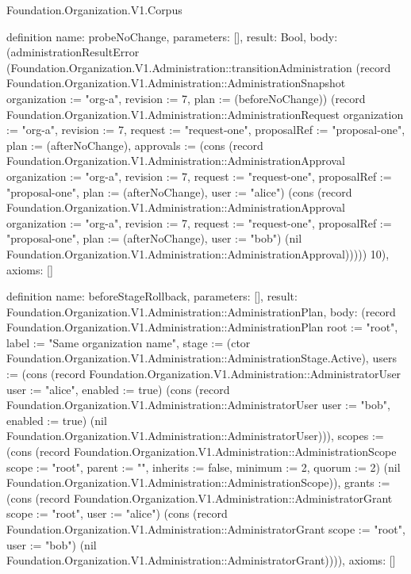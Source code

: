 \begin{lexlean}{Foundation.Organization.V1.Corpus}
\begin{semanticmodule}
definition{
  name: probeNoChange,
  parameters: [],
  result: Bool,
  body: (administrationResultError (Foundation.Organization.V1.Administration::transitionAdministration (record Foundation.Organization.V1.Administration::AdministrationSnapshot {organization := "org-a", revision := 7, plan := (beforeNoChange)}) (record Foundation.Organization.V1.Administration::AdministrationRequest {organization := "org-a", revision := 7, request := "request-one", proposalRef := "proposal-one", plan := (afterNoChange), approvals := (cons (record Foundation.Organization.V1.Administration::AdministrationApproval {organization := "org-a", revision := 7, request := "request-one", proposalRef := "proposal-one", plan := (afterNoChange), user := "alice"}) (cons (record Foundation.Organization.V1.Administration::AdministrationApproval {organization := "org-a", revision := 7, request := "request-one", proposalRef := "proposal-one", plan := (afterNoChange), user := "bob"}) (nil Foundation.Organization.V1.Administration::AdministrationApproval)))})) 10),
  axioms: []
}

definition{
  name: beforeStageRollback,
  parameters: [],
  result: Foundation.Organization.V1.Administration::AdministrationPlan,
  body: (record Foundation.Organization.V1.Administration::AdministrationPlan {root := "root", label := "Same organization name", stage := (ctor Foundation.Organization.V1.Administration::AdministrationStage.Active), users := (cons (record Foundation.Organization.V1.Administration::AdministratorUser {user := "alice", enabled := true}) (cons (record Foundation.Organization.V1.Administration::AdministratorUser {user := "bob", enabled := true}) (nil Foundation.Organization.V1.Administration::AdministratorUser))), scopes := (cons (record Foundation.Organization.V1.Administration::AdministrationScope {scope := "root", parent := "", inherits := false, minimum := 2, quorum := 2}) (nil Foundation.Organization.V1.Administration::AdministrationScope)), grants := (cons (record Foundation.Organization.V1.Administration::AdministratorGrant {scope := "root", user := "alice"}) (cons (record Foundation.Organization.V1.Administration::AdministratorGrant {scope := "root", user := "bob"}) (nil Foundation.Organization.V1.Administration::AdministratorGrant)))}),
  axioms: []
}


\end{semanticmodule}
\end{lexlean}

